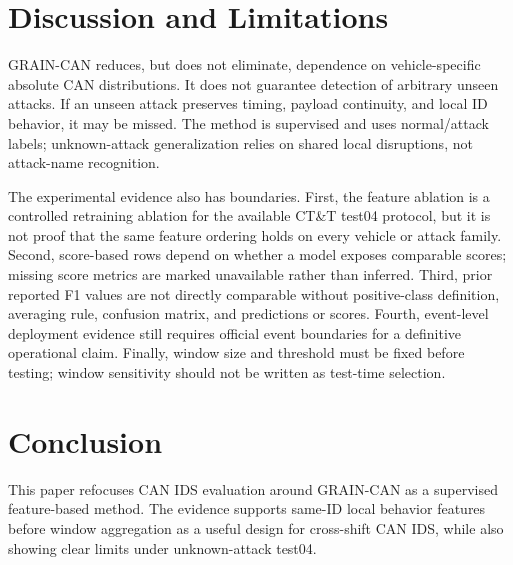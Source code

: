 \documentclass[runningheads]{llncs}
\begin{document}
\section{Discussion and Limitations}
GRAIN-CAN reduces, but does not eliminate, dependence on vehicle-specific absolute CAN distributions.  It does not guarantee detection of arbitrary unseen attacks.  If an unseen attack preserves timing, payload continuity, and local ID behavior, it may be missed.  The method is supervised and uses normal/attack labels; unknown-attack generalization relies on shared local disruptions, not attack-name recognition.

The experimental evidence also has boundaries.  First, the feature ablation is a controlled retraining ablation for the available CT\&T test04 protocol, but it is not proof that the same feature ordering holds on every vehicle or attack family.  Second, score-based rows depend on whether a model exposes comparable scores; missing score metrics are marked unavailable rather than inferred.  Third, prior reported F1 values are not directly comparable without positive-class definition, averaging rule, confusion matrix, and predictions or scores.  Fourth, event-level deployment evidence still requires official event boundaries for a definitive operational claim.  Finally, window size and threshold must be fixed before testing; window sensitivity should not be written as test-time selection.

\section{Conclusion}
This paper refocuses CAN IDS evaluation around GRAIN-CAN as a supervised feature-based method.  The evidence supports same-ID local behavior features before window aggregation as a useful design for cross-shift CAN IDS, while also showing clear limits under unknown-attack test04.



\end{document}
